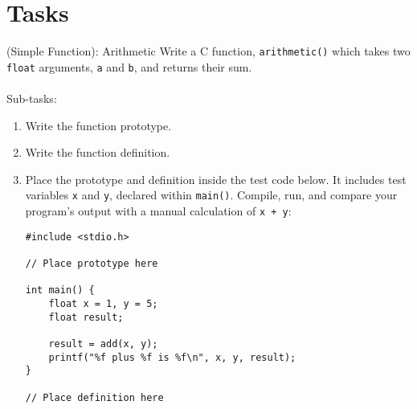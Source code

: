 \documentclass{lab}
\begin{document}
\pagebreak
\section{Tasks}

\begin{task}{(Simple Function): Arithmetic}{}
Write a C function, \texttt{arithmetic()} which takes two \texttt{float} arguments, \texttt{a} and \texttt{b}, and returns their sum.
\\~\\
Sub-tasks:
\begin{enumerate}
	\item Write the function prototype.
	\item Write the function definition.
	\item Place the prototype and definition inside the test code below. It includes test variables \texttt{x} and \texttt{y}, declared within \texttt{main()}. Compile, run, and compare your program's output with a manual calculation of \texttt{x + y}:
	\begin{lstlisting}[style=CStyle]
#include <stdio.h>
	
// Place prototype here
	
int main() {
	float x = 1, y = 5;
	float result;
	
	result = add(x, y);
	printf("%f plus %f is %f\n", x, y, result);
}

// Place definition here
	\end{lstlisting}
\end{enumerate}
\end{task}
\end{document}
